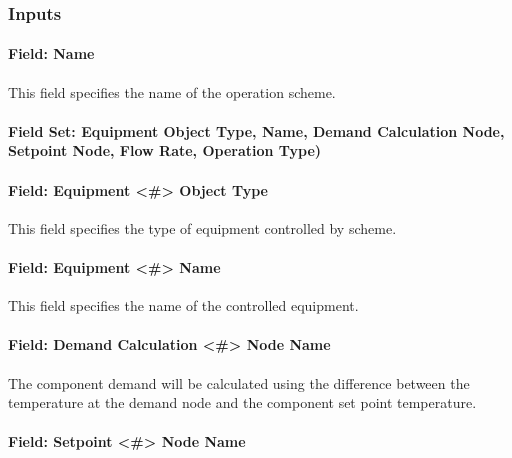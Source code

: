 \subsubsection{Inputs}\label{inputs-12-011}

\paragraph{Field: Name}\label{field-name-6-014}

This field specifies the name of the operation scheme.

\paragraph{Field Set: Equipment Object Type, Name, Demand Calculation Node, Setpoint Node, Flow Rate, Operation Type)}\label{field-set-equipment-object-type-name-demand-calculation-node-setpoint-node-flow-rate-operation-type}

\paragraph{Field: Equipment \textless{}\#\textgreater{} Object Type}\label{field-equipment-object-type}

This field specifies the type of equipment controlled by scheme.

\paragraph{Field: Equipment \textless{}\#\textgreater{} Name}\label{field-equipment-name}

This field specifies the name of the controlled equipment.

\paragraph{Field: Demand Calculation \textless{}\#\textgreater{} Node Name}\label{field-demand-calculation-node-name}

The component demand will be calculated using the difference between the temperature at the demand node and the component set point temperature.

\paragraph{Field: Setpoint \textless{}\#\textgreater{} Node Name}\label{field-setpoint-node-name}


